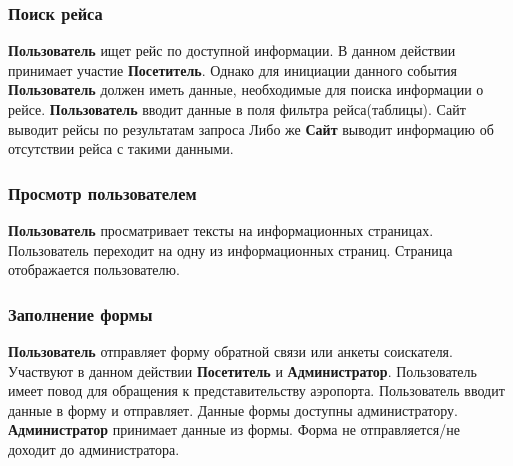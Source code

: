\subsubsection{Поиск рейса}
\textbf{Пользователь} ищет рейс по доступной информации. 
В данном действии принимает участие \textbf{Посетитель}.
Однако для инициации данного события \textbf{Пользователь}
должен иметь данные, необходимые для поиска информации о 
рейсе. \textbf{Пользователь} вводит данные в поля фильтра 
рейса(таблицы). Сайт выводит рейсы по результатам запроса
Либо же \textbf{Сайт} выводит информацию об отсутствии 
рейса с такими данными.

\subsubsection{Просмотр пользователем}
\textbf{Пользователь} просматривает тексты на информационных 
страницах. Пользователь переходит на одну из информационных 
страниц. Страница отображается пользователю.

\subsubsection{Заполнение формы}
\textbf{Пользователь} отправляет форму обратной связи или 
анкеты соискателя. Участвуют в данном действии 
\textbf{Посетитель} и \textbf{Администратор}.
Пользователь имеет повод для обращения к представительству 
аэропорта. Пользователь вводит данные в форму и отправляет.
Данные формы доступны администратору. \textbf{Администратор}
принимает данные из формы. Форма не отправляется/не 
доходит до администратора.

